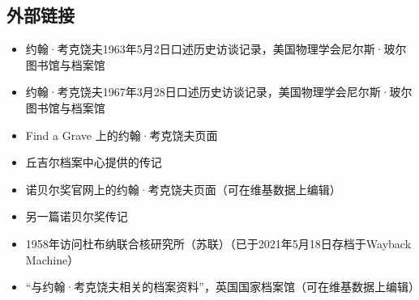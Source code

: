 \subsection{外部链接}
\begin{itemize}
\item 约翰·考克饶夫1963年5月2日口述历史访谈记录，美国物理学会尼尔斯·玻尔图书馆与档案馆
\item 约翰·考克饶夫1967年3月28日口述历史访谈记录，美国物理学会尼尔斯·玻尔图书馆与档案馆
\item Find a Grave 上的约翰·考克饶夫页面
\item 丘吉尔档案中心提供的传记
\item 诺贝尔奖官网上的约翰·考克饶夫页面（可在维基数据上编辑）
\item 另一篇诺贝尔奖传记
\item 1958年访问杜布纳联合核研究所（苏联）（已于2021年5月18日存档于Wayback Machine）
\item “与约翰·考克饶夫相关的档案资料”，英国国家档案馆（可在维基数据上编辑）
\end{itemize}